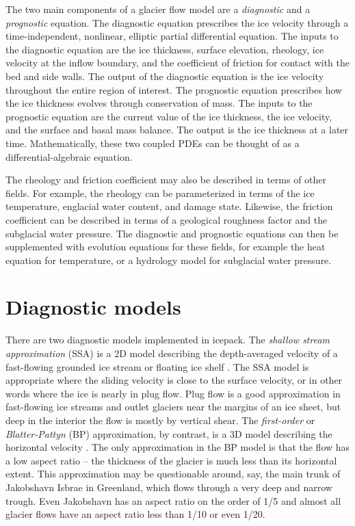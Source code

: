 \documentclass{article}
\theoremstyle{definition}
\theoremstyle{plain}
\begin{document}
The two main components of a glacier flow model are a \emph{diagnostic} and a \emph{prognostic} equation.
The diagnostic equation prescribes the ice velocity through a time-independent, nonlinear, elliptic partial differential equation.
The inputs to the diagnostic equation are the ice thickness, surface elevation, rheology, ice velocity at the inflow boundary, and the coefficient of friction for contact with the bed and side walls.
The output of the diagnostic equation is the ice velocity throughout the entire region of interest.
The prognostic equation prescribes how the ice thickness evolves through conservation of mass.
The inputs to the prognostic equation are the current value of the ice thickness, the ice velocity, and the surface and basal mass balance.
The output is the ice thickness at a later time.
Mathematically, these two coupled PDEs can be thought of as a differential-algebraic equation.

The rheology and friction coefficient may also be described in terms of other fields.
For example, the rheology can be parameterized in terms of the ice temperature, englacial water content, and damage state.
Likewise, the friction coefficient can be described in terms of a geological roughness factor and the subglacial water pressure.
The diagnostic and prognostic equations can then be supplemented with evolution equations for these fields, for example the heat equation for temperature, or a hydrology model for subglacial water pressure.


\section{Diagnostic models}

There are two diagnostic models implemented in icepack.
The \emph{shallow stream approximation} (SSA) is a 2D model describing the depth-averaged velocity of a fast-flowing grounded ice stream or floating ice shelf \citep{macayeal1989large}.
The SSA model is appropriate where the sliding velocity is close to the surface velocity, or in other words where the ice is nearly in plug flow.
Plug flow is a good approximation in fast-flowing ice streams and outlet glaciers near the margins of an ice sheet, but deep in the interior the flow is mostly by vertical shear.
The \emph{first-order} or \emph{Blatter-Pattyn} (BP) approximation, by contrast, is a 3D model describing the horizontal velocity \citep{blatter1995velocity, pattyn2003new}.
The only approximation in the BP model is that the flow has a low aspect ratio -- the thickness of the glacier is much less than its horizontal extent.
This approximation may be questionable around, say, the main trunk of Jakobshavn Isbrae in Greenland, which flows through a very deep and narrow trough.
Even Jakobshavn has an aspect ratio on the order of 1/5 and almost all glacier flows have an aspect ratio less than 1/10 or even 1/20.
\end{document}
